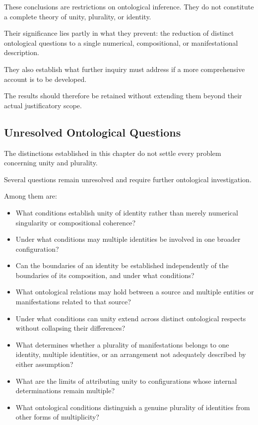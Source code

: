 These conclusions are restrictions
on ontological inference.
They do not constitute a complete
theory of unity, plurality,
or identity.

Their significance lies partly
in what they prevent:
the reduction of distinct
ontological questions to
a single numerical, compositional,
or manifestational description.

They also establish what
further inquiry must address
if a more comprehensive
account is to be developed.

The results should therefore
be retained without extending
them beyond their actual
justificatory scope.

\subsection{Unresolved Ontological Questions}

The distinctions established
in this chapter do not settle
every problem concerning
unity and plurality.

Several questions remain
unresolved and require further
ontological investigation.

Among them are:

\begin{itemize}
    \item What conditions establish
    unity of identity rather than
    merely numerical singularity
    or compositional coherence?

    \item Under what conditions
    may multiple identities
    be involved in one broader
    configuration?

    \item Can the boundaries
    of an identity be established
    independently of the boundaries
    of its composition, and
    under what conditions?

    \item What ontological relations
    may hold between a source
    and multiple entities or
    manifestations related
    to that source?

    \item Under what conditions
    can unity extend across
    distinct ontological respects
    without collapsing their
    differences?

    \item What determines whether
    a plurality of manifestations
    belongs to one identity,
    multiple identities, or
    an arrangement not adequately
    described by either assumption?

    \item What are the limits
    of attributing unity to
    configurations whose internal
    determinations remain multiple?

    \item What ontological conditions
    distinguish a genuine plurality
    of identities from other
    forms of multiplicity?
\end{itemize}

